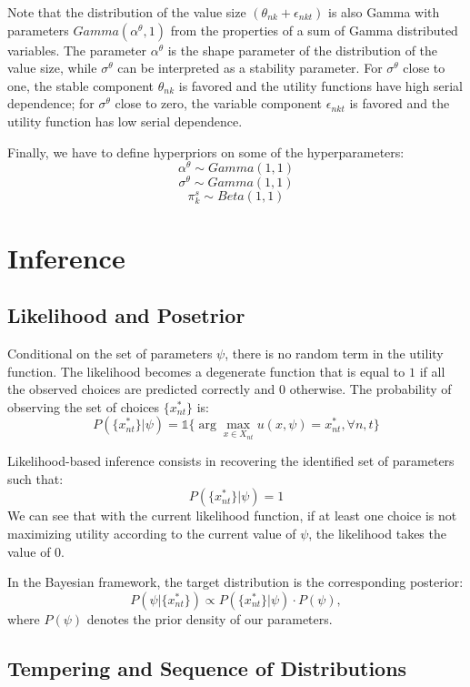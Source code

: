 \documentclass[12pt]{article}
\begin{document}
Note that the distribution of the value size $(\theta_{nk} + \epsilon_{nkt})$ is also Gamma with parameters $Gamma(\alpha^\theta,1)$ from the properties of a sum of Gamma distributed variables. The parameter $\alpha^\theta$ is the shape parameter of the distribution of the value size, while $\sigma^\theta$ can be interpreted as a stability parameter. 
For $\sigma^\theta$ close to one, the stable component $\theta_{nk}$ is favored and the utility functions have high serial dependence; for $\sigma^\theta$ close to zero, the variable component $\epsilon_{nkt}$ is favored and the utility function has low serial dependence.

Finally, we have to define hyperpriors on some of the hyperparameters:
$$\alpha^\theta \sim Gamma(1,1)$$
$$\sigma^\theta \sim Gamma(1,1)$$
$$ \pi_k^s \sim Beta(1,1) $$


\section{Inference}

\subsection{Likelihood and Posetrior} \label{sec:likelihood}
Conditional on the set of parameters $\psi$, there is no random term in the utility function. The likelihood becomes a degenerate function that is equal to $1$ if all the observed choices are predicted correctly and $0$ otherwise. The probability of observing the set of choices $\{x_{nt}^*\}$ is: 
$$P(\{x_{nt}^*\}|\psi) = \mathds{1}\{ \arg \max\limits_{x\in X_{nt}} u(x,\psi) = x_{nt}^*, \forall n,t \}$$

Likelihood-based inference consists in recovering the identified set of parameters such that: $$P(\{x_{nt}^*\}|\psi) = 1 $$
We can see that with the current likelihood function, if at least one choice is not maximizing utility according to the current value of $\psi$, the likelihood takes the value of $0$.

In the Bayesian framework, the target distribution is the corresponding posterior:
$$  P(\psi|\{x_{nt}^*\}) \propto P(\{x_{nt}^*\}|\psi) \cdot P(\psi),$$
where $P(\psi)$ denotes the prior density of our parameters.

\subsection{Tempering and Sequence of Distributions} 
\end{document}
